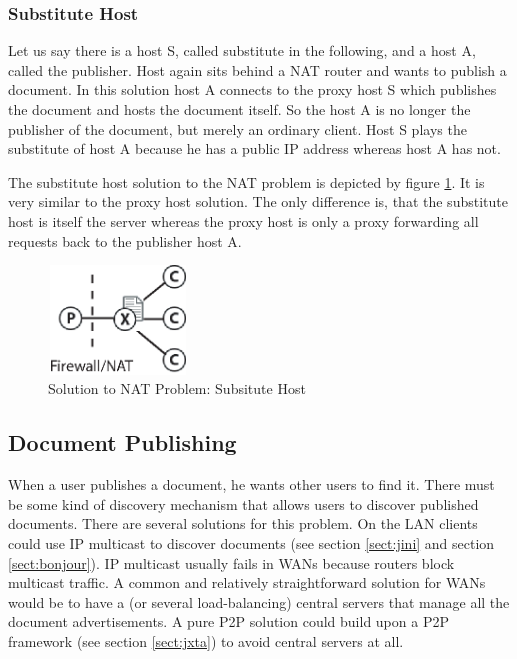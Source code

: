 \documentclass[11pt,a4paper]{article}
\begin{document}
\subsubsection{Substitute Host}
Let us say there is a host S, called substitute in the following, and a host A, called the publisher. Host again sits behind a NAT router and wants to publish a document. In this solution host A connects to the proxy host S which publishes the document and hosts the document itself. So the host A is no longer the publisher of the document, but merely an ordinary client. Host S plays the substitute of host A because he has a public IP address whereas host A has not.

The substitute host solution to the NAT problem is depicted by figure \ref{fig:substitute}. It is very similar to the proxy host solution. The only difference is, that the substitute host is itself the server whereas the proxy host is only a proxy forwarding all requests back to the publisher host A.

\begin{figure}[H]
 \centering
 \includegraphics[width=3.7cm,height=2.9cm]{../../images/net_substitute.eps}
 \caption{Solution to NAT Problem: Subsitute Host}
 \label{fig:substitute}
\end{figure}


\subsection{Document Publishing}
When a user publishes a document, he wants other users to find it. There must be some kind of discovery mechanism that allows users to discover published documents. There are several solutions for this problem. On the LAN clients could use IP multicast to discover documents (see section \ref{sect:jini} and section \ref{sect:bonjour}). IP multicast usually fails in WANs because routers block multicast traffic. A common and relatively straightforward solution for WANs would be to have a (or several load-balancing) central servers that manage all the document advertisements. A pure P2P solution could build upon a P2P framework (see section \ref{sect:jxta}) to avoid central servers at all.









\end{document}
